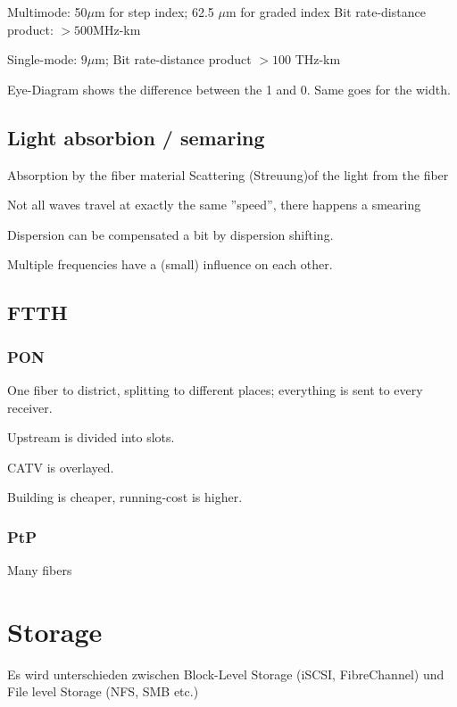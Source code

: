 Multimode: 50$\mu$m for step index; 62.5 $\mu$m for graded index
Bit rate-distance product: $>500$MHz-km

Single-mode: $9\mu$m;
Bit rate-distance product $>100$ THz-km


Eye-Diagram shows the difference between the 1 and 0. Same goes for the width.

\subsection{Light absorbion / semaring}

Absorption by the fiber material
Scattering (Streuung)of the light from the fiber

Not all waves travel at exactly the same ''speed'', there happens a smearing

Dispersion can be compensated a bit by dispersion shifting.


Multiple frequencies have a (small) influence on each other.


\subsection{FTTH}

\subsubsection{PON}

One fiber to district, splitting to different places; everything is sent to every receiver.

Upstream is divided into slots.

CATV is overlayed.

Building is cheaper, running-cost is higher.

\subsubsection{PtP}


Many fibers

\subsubsection{}


\section{Storage}

Es wird unterschieden zwischen Block-Level Storage (iSCSI, FibreChannel) und File level Storage (NFS, SMB etc.) 

